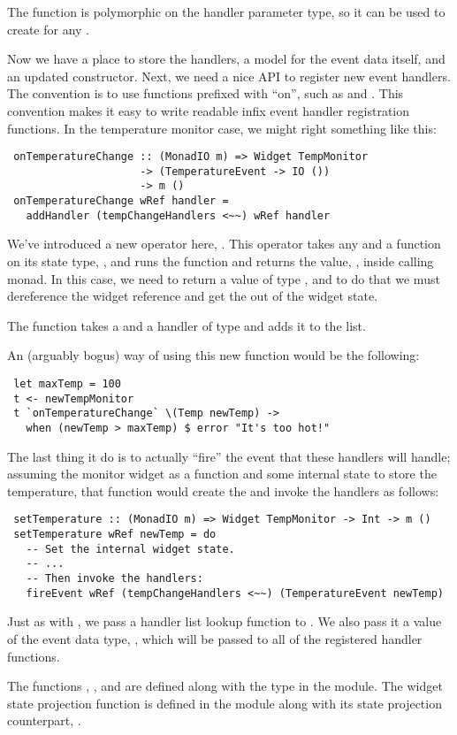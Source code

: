 The  function is polymorphic on the handler parameter
type, so it can be used to create  for any .

Now we have a place to store the handlers, a model for the event data
itself, and an updated constructor.  Next, we need a nice API to
register new event handlers.  The  convention is to use
functions prefixed with ``on'', such as  and
.  This convention makes it easy to write readable
infix event handler registration functions.  In the temperature
monitor case, we might right something like this:

\begin{verbatim}
 onTemperatureChange :: (MonadIO m) => Widget TempMonitor
                     -> (TemperatureEvent -> IO ())
                     -> m ()
 onTemperatureChange wRef handler =
   addHandler (tempChangeHandlers <~~) wRef handler
\end{verbatim}

We've introduced a new operator here, \fw{<\string~\string~}.  This
operator takes any  and a function on its state type,
, and runs the function and returns the value, ,
inside calling monad.  In this case, we need to return a value of type
, and to do that we must dereference the
widget reference and get the  out of the widget
state.

The  function takes a  and a handler of
type  and adds it to the  list.

An (arguably bogus) way of using this new function would be the
following:

\begin{verbatim}
 let maxTemp = 100
 t <- newTempMonitor
 t `onTemperatureChange` \(Temp newTemp) ->
   when (newTemp > maxTemp) $ error "It's too hot!"
\end{verbatim}

The last thing it do is to actually ``fire'' the event that these
handlers will handle; assuming the monitor widget as a
 function and some internal state to store the
temperature, that function would create the  and
invoke the handlers as follows:

\begin{verbatim}
 setTemperature :: (MonadIO m) => Widget TempMonitor -> Int -> m ()
 setTemperature wRef newTemp = do
   -- Set the internal widget state.
   -- ...
   -- Then invoke the handlers:
   fireEvent wRef (tempChangeHandlers <~~) (TemperatureEvent newTemp)
\end{verbatim}

Just as with , we pass a handler list lookup function
to .  We also pass it a value of the event data type,
, which will be passed to all of the registered handler
functions.

The functions , , and 
are defined along with the  type in the 
module.  The widget state projection function \fw{<\string~\string~}
is defined in the  module along with its 
state projection counterpart, \fw{<\string~}.
